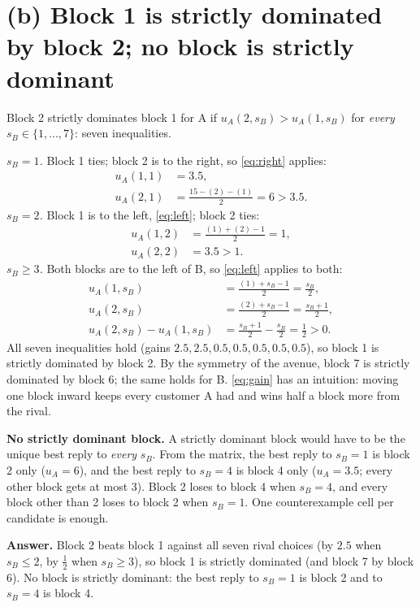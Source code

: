 \documentclass[11pt,a4paper]{article}
\newcommand{\answer}[1]{\begin{tcolorbox}[colback=ans!5,colframe=ans,boxrule=0.6pt,
  left=5pt,right=5pt,top=3pt,bottom=3pt]\textbf{Answer.} #1\end{tcolorbox}}
\begin{document}
\section*{(b) Block 1 is strictly dominated by block 2; no block is strictly dominant}

Block 2 strictly dominates block 1 for A if $u_A(2, s_B) > u_A(1, s_B)$ for \emph{every}
$s_B \in \{1, \dots, 7\}$: seven inequalities.

\emph{$s_B = 1$.} Block 1 ties; block 2 is to the right, so \eqref{eq:right} applies:
\begin{align*}
  u_A(1, 1) &= 3.5,\\
  u_A(2, 1) &= \frac{15 - (2) - (1)}{2} = 6 > 3.5.
\end{align*}
\emph{$s_B = 2$.} Block 1 is to the left, \eqref{eq:left}; block 2 ties:
\begin{align*}
  u_A(1, 2) &= \frac{(1) + (2) - 1}{2} = 1,\\
  u_A(2, 2) &= 3.5 > 1.
\end{align*}
\emph{$s_B \ge 3$.} Both blocks are to the left of B, so \eqref{eq:left} applies to both:
\begin{align}
  u_A(1, s_B) &= \frac{(1) + s_B - 1}{2} = \frac{s_B}{2}, \nonumber\\
  u_A(2, s_B) &= \frac{(2) + s_B - 1}{2} = \frac{s_B + 1}{2}, \nonumber\\
  u_A(2, s_B) - u_A(1, s_B) &= \frac{s_B + 1}{2} - \frac{s_B}{2} = \frac12 > 0. \label{eq:gain}
\end{align}
All seven inequalities hold (gains $2.5, 2.5, 0.5, 0.5, 0.5, 0.5, 0.5$), so block 1 is strictly
dominated by block 2. By the symmetry of the avenue, block 7 is strictly dominated by block 6;
the same holds for B. \eqref{eq:gain} has an intuition: moving one block inward keeps every
customer A had and wins half a block more from the rival.

\textbf{No strictly dominant block.} A strictly dominant block would have to be the unique best
reply to \emph{every} $s_B$. From the matrix, the best reply to $s_B = 1$ is block 2 only
($u_A = 6$), and the best reply to $s_B = 4$ is block 4 only ($u_A = 3.5$; every other block gets
at most $3$). Block 2 loses to block 4 when $s_B = 4$, and every block other than 2 loses to
block 2 when $s_B = 1$. One counterexample cell per candidate is enough.

\answer{Block 2 beats block 1 against all seven rival choices (by $2.5$ when $s_B \le 2$, by
$\tfrac12$ when $s_B \ge 3$), so block 1 is strictly dominated (and block 7 by block 6). No block is
strictly dominant: the best reply to $s_B = 1$ is block 2 and to $s_B = 4$ is block 4.}
\end{document}
